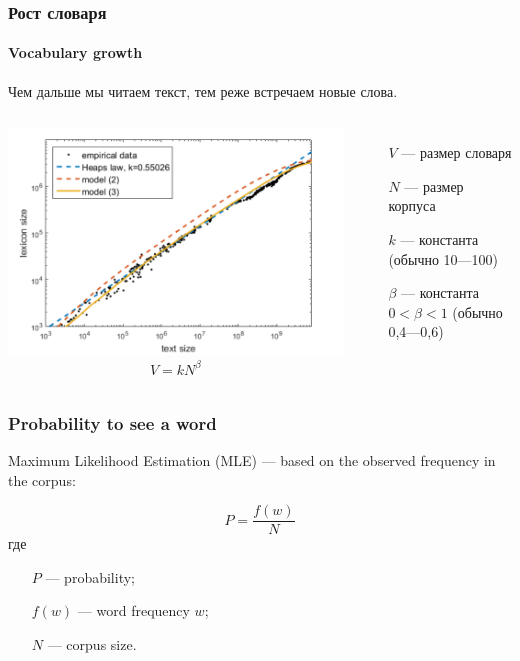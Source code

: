 \documentclass[svgnames]{beamer}
\begin{document}
\begin{frame}
  \frametitle{Рост словаря}
  \framesubtitle{Vocabulary growth}
  Чем дальше мы читаем текст, тем реже встречаем новые слова.
  \begin{columns}
    \includegraphics[width=\textwidth]{heaps-law}
  \begin{equation}
    V = kN^{\beta}
  \end{equation}
  \begin{itemize}
  \item[$V$] — размер словаря
  \item[$N$] — размер корпуса
  \item[$k$] — константа (обычно 10—100)
  \item[$\beta$] — константа $0 < \beta < 1$ (обычно 0,4—0,6)
  \end{itemize}
  \end{columns}
\end{frame}

\begin{frame}
  \frametitle{Probability to see a word}

  Maximum Likelihood Estimation (MLE) — based on the observed
  frequency in the corpus:

  $$
  P = \frac{f(w)}{N}
  $$
  где 
  \begin{itemize}
  \item[$P$] — probability;
  \item[$f(w)$] — word frequency $w$;
  \item[$N$] — corpus size.
  \end{itemize}
\end{frame}
\end{document}
